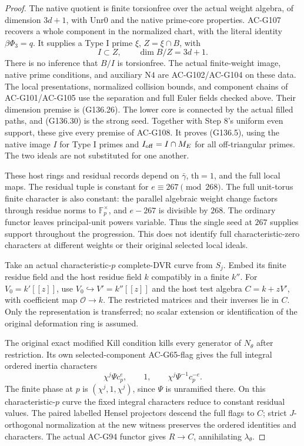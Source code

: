 \begin{proof}
The native quotient is finite torsionfree over the actual
weight algebra, of dimension \(3d+1\), with
\(\mathrm{Unr0}\) and the native prime-core properties.
AC-G107 recovers a whole component in the normalized
chart, with the literal identity \(\beta\Phi_3=q\).
It supplies a Type I prime \(\xi\), \(Z=\xi\cap B\), with
\[
                    I\subset Z,\qquad\dim B/Z=3d+1.
 \tag{G136.30}
\]
There is no inference that \(B/I\) is torsionfree.
The actual finite-weight image, native prime conditions,
and auxiliary \(\mathrm{N4}\) are AC-G102/AC-G104 on
these data.  The local presentations, normalized collision
bounds, and component chains of AC-G101/AC-G105 use
the separation and full Euler fields checked above.
Their dimension premise is (G136.26).  The lower core
is connected by the actual filled paths, and (G136.30)
is the strong seed.  Together with Step 8's uniform
even support, these give every premise of AC-G108.
It proves (G136.5), using the native image \(I\) for
Type I primes and \(I_{\rm off}=I\cap M_E\) for all
off-triangular primes.  The two ideals are not substituted
for one another.

These host rings and residual records depend on
\(\bar\gamma\), \(\mathrm{th}=1\), and the full local maps.
The residual tuple is constant for
\(e\equiv267\pmod{268}\).
The full unit-torus finite character is also constant:
the parallel algebraic weight change factors through
residue norms to \(\mathbb F_p^\times\), and \(e-267\)
is divisible by \(268\).
The ordinary functor leaves principal-unit powers
variable.  Thus the single seed at \(267\) supplies
support throughout the progression.  This does not
identify full characteristic-zero characters at different
weights or their original selected local ideals.

Take an actual characteristic-\(p\) complete-DVR curve
from \(S_j\).  Embed its finite residue field and the
host residue field \(k\) compatibly in a finite \(k''\).
For \(V_0=k'[[z]]\), use
\(V_0\hookrightarrow V'=k''[[z]]\) and the host test
algebra \(C=k+zV'\), with coefficient map
\(\mathcal O\to k\).
The restricted matrices and their inverses lie in \(C\).
Only the representation is transferred; no scalar
extension or identification of the original deformation
ring is assumed.

The original exact modified Kill condition kills every
generator of \(N_\theta\) after restriction.
Its own selected-component AC-G65-flag gives the full
integral ordered inertia characters
\[
       \chi^j\Psi c_p^e,\qquad1,\qquad
                     \chi^j\Psi^{-1}c_p^{-e}.
 \tag{G136.31}
\]
The finite phase at \(p\) is \((\chi^j,1,\chi^j)\),
since \(\Psi\) is unramified there.
On this characteristic-\(p\) curve the fixed integral
characters reduce to constant residual values.
The paired labelled Hensel projectors descend the full
flags to \(C\); strict \(J\)-orthogonal normalization at
the new witness preserves the ordered identities and
characters.  The actual AC-G94 functor gives \(R\to C\),
annihilating \(\lambda_\theta\).


\end{proof}
